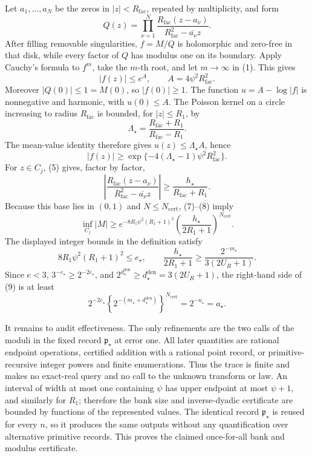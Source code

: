 Let \(a_1,\ldots,a_N\) be the zeros in \(|z|<R_{\mathrm{fac}}\), repeated by multiplicity, and form
\[
 Q(z)=\prod_{\nu=1}^N
 \frac{R_{\mathrm{fac}}(z-a_\nu)}
      {R_{\mathrm{fac}}^2-\overline{a_\nu}z}.
\]
After filling removable singularities, \(f=M/Q\) is holomorphic and zero-free in that disk, while every factor of \(Q\) has modulus one on its boundary.  Apply Cauchy's formula to \(f^m\), take the \(m\)-th root, and let \(m\to\infty\) in (1).  This gives
\[
 |f(z)|\le e^A,\qquad A=4\psi^2R_{\mathrm{fac}}^2. \tag{6}
\]
Moreover \(|Q(0)|\le1=M(0)\), so \(|f(0)|\ge1\).  The function \(u=A-\log|f|\) is nonnegative and harmonic, with \(u(0)\le A\).  The Poisson kernel on a circle increasing to radius \(R_{\mathrm{fac}}\) is bounded, for \(|z|\le R_1\), by
\[
 \Lambda_{\star}
 =\frac{R_{\mathrm{fac}}+R_1}{R_{\mathrm{fac}}-R_1}.
\]
The mean-value identity therefore gives \(u(z)\le\Lambda_{\star}A\), hence
\[
 |f(z)|\ge
 \exp\{-4(\Lambda_{\star}-1)\psi^2R_{\mathrm{fac}}^2\}. \tag{7}
\]
For \(z\in C_j\), (5) gives, factor by factor,
\[
 \left|
 \frac{R_{\mathrm{fac}}(z-a_\nu)}
      {R_{\mathrm{fac}}^2-\overline{a_\nu}z}
 \right|
 \ge\frac{h_{\star}}{R_{\mathrm{fac}}+R_1}. \tag{8}
\]
Because this base lies in \((0,1)\) and \(N\le N_{\mathrm{cert}}\), (7)--(8) imply
\[
 \inf_{C_j}|M|
 \ge e^{-8R_1\psi^2(R_1+1)^2}
 \left(\frac{h_{\star}}{2R_1+1}\right)^{N_{\mathrm{cert}}}. \tag{9}
\]
The displayed integer bounds in the definition satisfy
\[
 8R_1\psi^2(R_1+1)^2\le e_{\star},
 \qquad
 \frac{h_{\star}}{2R_1+1}
 \ge\frac{2^{-m_{\star}}}{3(2U_R+1)}.
\]
Since \(e<3\), \(3^{-e_{\star}}\ge2^{-2e_{\star}}\), and \(2^{d_{\star}^{\mathrm{den}}}\ge d_{\star}^{\mathrm{den}}=3(2U_R+1)\), the right-hand side of (9) is at least
\[
 2^{-2e_{\star}}
 \left\{2^{-(m_{\star}+d_{\star}^{\mathrm{den}})}\right\}^{N_{\mathrm{cert}}}
 =2^{-u_{\star}}=a_{\star}. \tag{10}
\]

It remains to audit effectiveness.  The only refinements are the two calls of the moduli in the fixed record \(\mathfrak p_{\star}\) at error one.  All later quantities are rational endpoint operations, certified addition with a rational point record, or primitive-recursive integer powers and finite enumerations.  Thus the trace is finite and makes no exact-real query and no call to the unknown transform or law.  An interval of width at most one containing \(\psi\) has upper endpoint at most \(\psi+1\), and similarly for \(R_1\); therefore the bank size and inverse-dyadic certificate are bounded by functions of the represented values.  The identical record \(\mathfrak p_{\star}\) is reused for every \(n\), so it produces the same outputs without any quantification over alternative primitive records.  This proves the claimed once-for-all bank and modulus certificate.